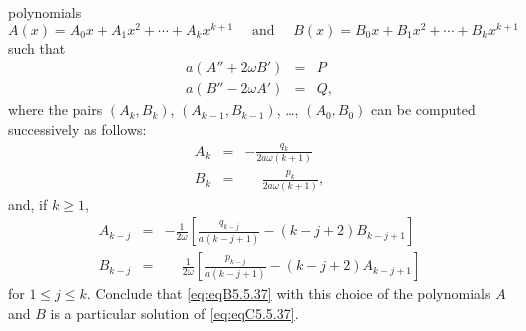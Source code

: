 \documentclass{ximera}
\begin{document}
\begin{problem}
\begin{enumerate}
polynomials
$$
A(x)=A_0x+A_1x^2+\cdots+A_kx^{k+1}\quad \text{ and } \quad
B(x)=B_0x+B_1x^2+\cdots+B_kx^{k+1}
$$
such that
$$
\begin{array}{rcl}
a(A''+2\omega B')&=&P\\ 
a(B''-2\omega A')&=&Q,
\end{array}
$$
where the pairs $(A_k,B_k)$, $(A_{k-1},B_{k-1})$, \dots, $(A_0,B_0)$ can be
computed successively as follows:
\begin{eqnarray*}
A_k&=&-\frac{q_k}{2a\omega(k+1)}\\ 
B_k&=&\phantom{-}\frac{p_k}{2a\omega(k+1)},
\end{eqnarray*}
and, if $k\ge 1$,
\begin{eqnarray*}
A_{k-j}&=&-\frac{1}{2\omega}
\left[\frac{q_{k-j}}{a(k-j+1)}-(k-j+2)B_{k-j+1}\right]\\ 
B_{k-j}&=&\phantom{-}\frac{1}{2\omega}
\left[\frac{p_{k-j}}{a(k-j+1)}-(k-j+2)A_{k-j+1}\right]
\end{eqnarray*}
for $1\le j\le k$.
Conclude that \ref{eq:eqB5.5.37} with this choice of the
polynomials $A$ and $B$ is a particular solution of
\ref{eq:eqC5.5.37}.
\end{enumerate}
\end{problem}
\end{document}
